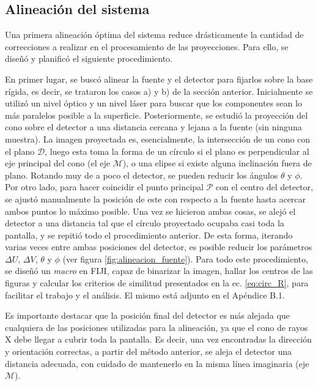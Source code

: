\subsection{Alineación del sistema}

Una primera alineación óptima del sistema reduce drásticamente la cantidad de correcciones
a realizar en el procesamiento de las proyecciones. Para ello, se diseñó y planificó el
siguiente procedimiento.

En primer lugar, se buscó alinear la fuente y el detector para fijarlos sobre la base
rígida, es decir, se trataron los casos a) y b) de la sección anterior. Inicialmente se utilizó
un nivel óptico y un nivel láser para buscar que los componentes sean lo más paralelos posible
a la superficie. Posteriormente, se
estudió la proyección del cono sobre el detector a una distancia cercana y lejana a la
fuente (sin ninguna muestra). La imagen proyectada es, esencialmente, la intersección de
un cono con el plano $\mathcal{D}$, luego esta toma la forma de un círculo si el plano
es perpendicular al eje principal del cono (el eje $\mathcal{M}$), o una elipse si 
existe alguna inclinación fuera de plano. Rotando muy de a poco el detector, 
se pueden reducir los ángulos $\theta$ y $\phi$. 
Por otro lado, para hacer coincidir el punto principal $\mathcal{P}$
con el centro del detector, se ajustó manualmente la posición de este con respecto a la
fuente hasta acercar ambos puntos lo máximo posible. Una vez se hicieron ambas cosas,
se alejó el detector a una distancia tal que el círculo proyectado ocupaba casi toda
la pantalla, y se repitió todo el procedimiento anterior. De esta forma, iterando varias
veces entre ambas posiciones del detector, es posible reducir los parámetros $\Delta U$,
$\Delta V$, $\theta$ y $\phi$ (ver figura \ref{fig:alineacion_fuente}). Para todo este
procedimiento, se diseñó un \textit{macro} en FIJI, capaz de binarizar la imagen, hallar los centros
de las figuras y calcular los criterios de similitud presentados en la ec. \ref{eq:circ_R},
para facilitar el trabajo y el análisis. El mismo está adjunto en el Apéndice B.1.

Es importante destacar que la posición final del detector es más alejada que cualquiera
de las posiciones utilizadas para la alineación, ya que el cono de rayos X debe llegar
a cubrir toda la pantalla. Es decir, una vez encontradas la dirección y orientación
correctas, a partir del método anterior, se aleja el detector una distancia adecuada,
con cuidado de mantenerlo en la misma línea imaginaria (eje $\mathcal{M}$). 

